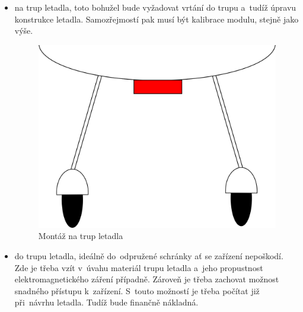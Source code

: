 \begin{itemize}
			\item na trup letadla, toto bohužel bude vyžadovat vrtání do trupu a~tudíž úpravu konstrukce letadla. Samozřejmostí pak musí být kalibrace modulu, stejně jako výše.
			
			\begin{figure}[H]
				\begin{center}
					\includegraphics[scale=0.5]{obrazky-figures/umisteni_na_trup.png}
					\caption{Montáž na trup letadla}
					\label{navrh::umisteni_bricho}
				\end{center}
			\end{figure}
			
			\item do trupu letadla, ideálně do~odpružené schránky ať se zařízení nepoškodí. Zde je třeba vzít v~úvahu materiál trupu letadla a~jeho propustnost elektromagnetického záření případně. Zároveň je třeba zachovat možnost snadného přístupu k~zařízení. S~touto možností je třeba počítat již při~návrhu letadla. Tudíž bude finančně nákladná.
			

\end{itemize}
